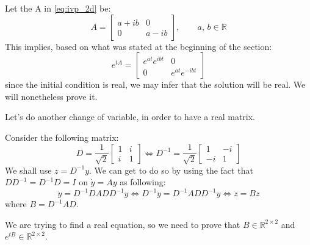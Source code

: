 \begin{example}
\label{ex:complex_coeff}
    Let the A in \autoref{eq:ivp_2d} be:
    \begin{equation*}
        A=\begin{bmatrix}
            a+ib & 0 \\
            0 & a-ib
        \end{bmatrix},\qquad a,\,b\in\mathbb{R} 
    \end{equation*}
    This implies, based on what was stated at the beginning of the section:
    \begin{equation*}
        e^{tA}=\begin{bmatrix}
            e^{at}e^{ibt} & 0 \\
            0 & e^{at}e^{-ibt}
        \end{bmatrix}
    \end{equation*}
    since the initial condition is real, we may infer that the solution will be real. We will nonetheless prove it. 
    
    Let's do another change of variable, in order to have a real matrix.

    Consider the following matrix:
    \begin{equation*}
        D=\frac{1}{\sqrt{2}}\begin{bmatrix}
            1 & i \\
            i & 1
        \end{bmatrix} \Leftrightarrow D^{-1}=\frac{1}{\sqrt{2}}\begin{bmatrix}
            1 & -i \\
            -i & 1
        \end{bmatrix} 
    \end{equation*}
    We shall use $z=D^{-1}y$. We can get to do so by using the fact that $DD^{-1}=D^{-1}D=I$ on $\dot{y}=Ay$ as following:
    \begin{equation*}
        \dot{y}=D^{-1}DADD^{-1}y \Leftrightarrow D^{-1}\dot{y}=D^{-1}ADD^{-1}y\Leftrightarrow \dot{z}=Bz
    \end{equation*} 
    where $B=D^{-1}AD$. 
    
    We are trying to find a real equation, so we need to prove that
    $B\in\mathbb{R}^{2\times 2}$ and $e^{tB}\in\mathbb{R}^{2\times 2}$. 


\end{example}
